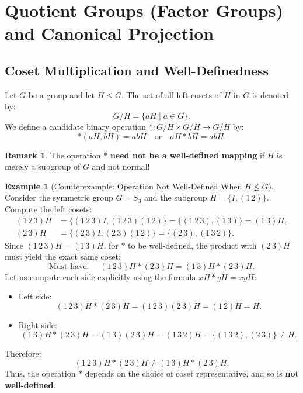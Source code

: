 \documentclass[12pt]{article}
\theoremstyle{definition}
\newtheorem{example}[definition]{Example}
\newtheorem*{remark}{Remark}
\theoremstyle{plain}
\begin{document}
\newpage
\section{Quotient Groups (Factor Groups) and Canonical Projection}

\subsection{Coset Multiplication and Well-Definedness}

Let $G$ be a group and let $H \le G$.
The set of all left cosets of $H$ in $G$ is denoted by:
\[
G/H = \{ aH \mid a \in G \}.
\]
We define a candidate binary operation $*: G/H \times G/H \to G/H$ by:
\[
*(aH, bH) = abH \quad \text{or} \quad aH * bH = abH.
\]

\begin{remark}
The operation $*$ \textbf{need not be a well-defined mapping} if $H$ is merely a subgroup of $G$ and not normal!
\end{remark}

\begin{example}[Counterexample: Operation Not Well-Defined When $H \not\trianglelefteq G$]
Consider the symmetric group $G = S_3$ and the subgroup $H = \{ I, (1\,2) \}$.
Compute the left cosets:
\begin{align*}
(1\,2\,3)H &= \{ (1\,2\,3)I, (1\,2\,3)(1\,2) \} = \{ (1\,2\,3), (1\,3) \} = (1\,3)H, \\
(2\,3)H &= \{ (2\,3)I, (2\,3)(1\,2) \} = \{ (2\,3), (1\,3\,2) \}.
\end{align*}
Since $(1\,2\,3)H = (1\,3)H$, for $*$ to be well-defined, the product with $(2\,3)H$ must yield the exact same coset:
\[
\text{Must have: } \quad (1\,2\,3)H * (2\,3)H = (1\,3)H * (2\,3)H.
\]
Let us compute each side explicitly using the formula $xH * yH = xyH$:
\begin{itemize}
    \item Left side:
    \[
    (1\,2\,3)H * (2\,3)H = (1\,2\,3)(2\,3)H = (1\,2)H = H.
    \]
    \item Right side:
    \[
    (1\,3)H * (2\,3)H = (1\,3)(2\,3)H = (1\,3\,2)H = \{ (1\,3\,2), (2\,3) \} \neq H.
    \]
\end{itemize}
Therefore:
\[
(1\,2\,3)H * (2\,3)H \neq (1\,3)H * (2\,3)H.
\]
Thus, the operation $*$ depends on the choice of coset representative, and so is \textbf{not well-defined}.
\end{example}
\end{document}

